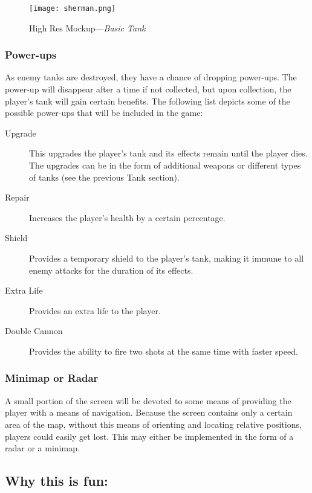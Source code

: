 \documentclass[letterpaper,11pt,twoside]{article}
\begin{document}
\begin{figure}[htb]
 \centering
 \texttt{[image: sherman.png]}
 \label{fig:basictank}
 \caption{High Res Mockup---\emph{Basic Tank}}
\end{figure}

\subsubsection{Power-ups}

As enemy tanks are destroyed, they have a chance of dropping power-ups. The power-up will disappear after a time if not collected, but upon collection, the player's tank will gain certain benefits. The following list depicts some of the possible power-ups that will be included in the game:

\begin{description}
 \item[Upgrade] This upgrades the player's tank and its effects remain until the player dies. The upgrades can be in the form of additional weapons or different types of tanks (see the previous Tank section).
 \item[Repair] Increases the player's health by a certain percentage.
 \item[Shield] Provides a temporary shield to the player's tank, making it immune to all enemy attacks for the duration of its effects.
 \item[Extra Life] Provides an extra life to the player.
 \item[Double Cannon] Provides the ability to fire two shots at the same time with faster speed.
\end{description}

\subsubsection{Minimap or Radar}

A small portion of the screen will be devoted to some means of providing the player with a means of navigation. Because the screen contains only a certain area of the map, without this means of orienting and locating relative positions, players could easily get lost. This may either be implemented in the form of a radar or a minimap.

\subsection{Why this is fun:}
\end{document}
